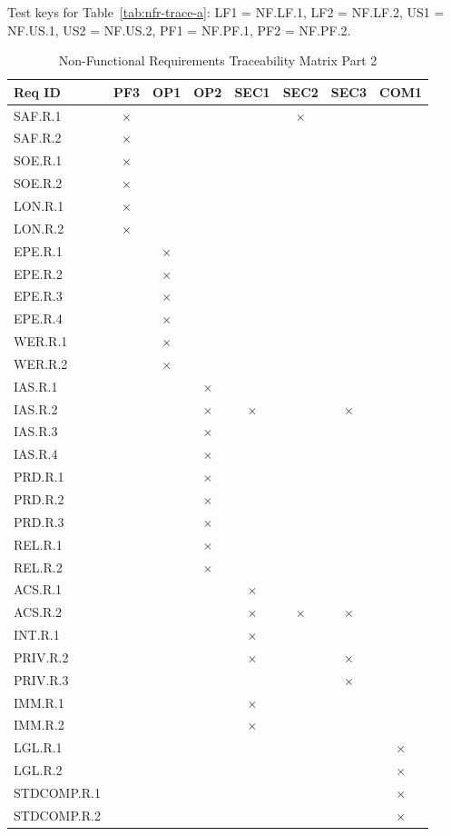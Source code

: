 \documentclass[12pt]{article}
\begin{document}
\noindent
Test keys for Table~\ref{tab:nfr-trace-a}:
LF1 = NF.LF.1, LF2 = NF.LF.2, US1 = NF.US.1,
US2 = NF.US.2, PF1 = NF.PF.1, PF2 = NF.PF.2.

\begin{table}[htbp]
\centering
\small
\caption{Non-Functional Requirements Traceability Matrix Part 2}
\label{tab:nfr-trace-b}
\begin{tabular}{|l|c|c|c|c|c|c|c|}
\hline
Req ID & PF3 & OP1 & OP2 & SEC1 & SEC2 & SEC3 & COM1 \\
\hline
SAF.R.1 & $\times$ & & & & $\times$ & & \\
\hline
SAF.R.2 & $\times$ & & & & & & \\
\hline
SOE.R.1 & $\times$ & & & & & & \\
\hline
SOE.R.2 & $\times$ & & & & & & \\
\hline
LON.R.1 & $\times$ & & & & & & \\
\hline
LON.R.2 & $\times$ & & & & & & \\
\hline
EPE.R.1 & & $\times$ & & & & & \\
\hline
EPE.R.2 & & $\times$ & & & & & \\
\hline
EPE.R.3 & & $\times$ & & & & & \\
\hline
EPE.R.4 & & $\times$ & & & & & \\
\hline
WER.R.1 & & $\times$ & & & & & \\
\hline
WER.R.2 & & $\times$ & & & & & \\
\hline
IAS.R.1 & & & $\times$ & & & & \\
\hline
IAS.R.2 & & & $\times$ & $\times$ & & $\times$ & \\
\hline
IAS.R.3 & & & $\times$ & & & & \\
\hline
IAS.R.4 & & & $\times$ & & & & \\
\hline
PRD.R.1 & & & $\times$ & & & & \\
\hline
PRD.R.2 & & & $\times$ & & & & \\
\hline
PRD.R.3 & & & $\times$ & & & & \\
\hline
REL.R.1 & & & $\times$ & & & & \\
\hline
REL.R.2 & & & $\times$ & & & & \\
\hline
ACS.R.1 & & & & $\times$ & & & \\
\hline
ACS.R.2 & & & & $\times$ & $\times$ & $\times$ & \\
\hline
INT.R.1 & & & & $\times$ & & & \\
\hline
PRIV.R.2 & & & & $\times$ & & $\times$ & \\
\hline
PRIV.R.3 & & & & & & $\times$ & \\
\hline
IMM.R.1 & & & & $\times$ & & & \\
\hline
IMM.R.2 & & & & $\times$ & & & \\
\hline
LGL.R.1 & & & & & & & $\times$ \\
\hline
LGL.R.2 & & & & & & & $\times$ \\
\hline
STDCOMP.R.1 & & & & & & & $\times$ \\
\hline
STDCOMP.R.2 & & & & & & & $\times$ \\
\hline
\end{tabular}
\end{table}
\FloatBarrier
\end{document}
